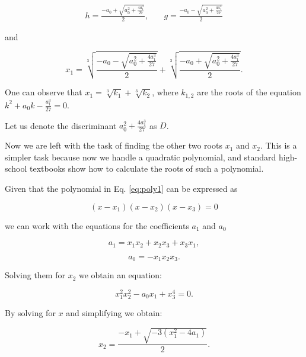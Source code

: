 \documentclass{article}
\begin{document}
\begin{equation}
  \begin{aligned}
    h=\frac{-a_0+\sqrt{a_0^2+\frac{4a_1^3}{27}}}{2}, \quad & g=\frac{-a_0-\sqrt{a_0^2+\frac{4a_1^3}{27}}}{2} 
  \end{aligned}
\end{equation}

and

\begin{equation}
  x_1=\sqrt[3]{\frac{-a_0-\sqrt{a_0^2+\frac{4a_1^3}{27}}}{2}}+\sqrt[3]{\frac{-a_0+\sqrt{a_0^2+\frac{4a_1^3}{27}}}{2}}.
\end{equation}

One can observe that $x_1=\sqrt[3]{k_1}+\sqrt[3]{k_2}$, where $k_{1,2}$ are the roots of the equation $k^2+a_0k-\frac{a_1^{3}}{27}=0$.

Let us denote the discriminant $a_0^2+\frac{4a_1^3}{27}$ as $D$.

Now we are left with the task of finding the other two roots $x_1$ and $x_2$. This is a simpler task because now we handle a quadratic polynomial, and standard high-school textbooks show how to calculate the roots of such a polynomial.

Given that the polynomial in Eq. \eqref{eq:poly1} can be expressed as

\begin{equation}
  \left(x-x_1\right)\left(x-x_2\right)\left(x-x_3\right)=0
\end{equation}

we can work with the equations for the coefficients $a_1$ and $a_0$

\begin{equation}
  a_1=x_1x_2+x_2x_3+x_3x_1,
\end{equation}

\begin{equation}
  a_0=-x_1x_2x_3.
\end{equation}

Solving them for $x_2$ we obtain an equation:

\begin{equation}
  x_1^2x_2^2-a_0x_1+x_3^4=0.
\end{equation}

By solving for $x$ and simplifying we obtain:

\begin{equation}
  x_2=\frac{-x_1+\sqrt{-3\left(x_1^2-4a_1\right)}}{2}.
\end{equation}
\end{document}

